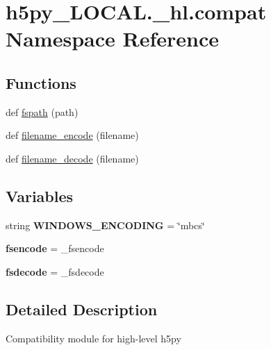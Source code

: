 \hypertarget{namespaceh5py__LOCAL_1_1__hl_1_1compat}{}\section{h5py\+\_\+\+L\+O\+C\+A\+L.\+\_\+hl.\+compat Namespace Reference}
\label{namespaceh5py__LOCAL_1_1__hl_1_1compat}
\subsection*{Functions}
\begin{DoxyCompactItemize}
\item 
def \hyperlink{namespaceh5py__LOCAL_1_1__hl_1_1compat_a35e921f00c10f67583d2af9f1d3b575d}{fspath} (path)
\item 
def \hyperlink{namespaceh5py__LOCAL_1_1__hl_1_1compat_a1a45bbd1f0d4b6481950a6a083ccb622}{filename\+\_\+encode} (filename)
\item 
def \hyperlink{namespaceh5py__LOCAL_1_1__hl_1_1compat_ae4262f370973f368bf6a3b68ab22c5cf}{filename\+\_\+decode} (filename)
\end{DoxyCompactItemize}
\subsection*{Variables}
\begin{DoxyCompactItemize}
\item 
\mbox{\label{namespaceh5py__LOCAL_1_1__hl_1_1compat_a5a5ae6c6da3f2221e4656f1836e8f652}} 
string {\bfseries W\+I\+N\+D\+O\+W\+S\+\_\+\+E\+N\+C\+O\+D\+I\+NG} = \char`\"{}mbcs\char`\"{}
\item 
\mbox{\label{namespaceh5py__LOCAL_1_1__hl_1_1compat_a02be6f1294550ff56a0f3b6204003ecb}} 
{\bfseries fsencode} = \+\_\+fsencode
\item 
\mbox{\label{namespaceh5py__LOCAL_1_1__hl_1_1compat_a51b9d1fbed4a05d38f2e2361e9145968}} 
{\bfseries fsdecode} = \+\_\+fsdecode
\end{DoxyCompactItemize}


\subsection{Detailed Description}
\begin{DoxyVerb}Compatibility module for high-level h5py
\end{DoxyVerb}
 

